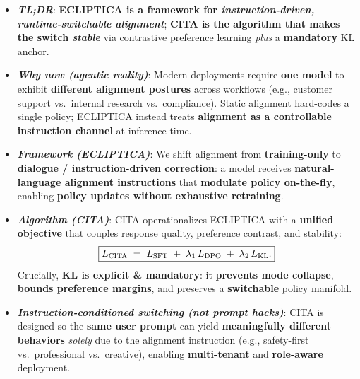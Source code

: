 \documentclass[11pt]{article}
\begin{document}
\begin{defin}
\scriptsize
\vspace{-2mm}
\begin{itemize}[left=-4pt,itemsep=0pt,topsep=0pt,parsep=0pt]

\item[\faBolt] \textbf{\textit{TL;DR}}:
\textbf{ECLIPTICA is a framework for \emph{instruction-driven, runtime-switchable alignment}};
\textbf{CITA is the algorithm that makes the switch \emph{stable}} via contrastive preference learning \emph{plus} a \textbf{mandatory} KL anchor.

\item[\faGlobeAmericas] \textbf{\textit{Why now (agentic reality)}}:
Modern deployments require \textbf{one model} to exhibit \textbf{different alignment postures} across workflows (e.g., customer support vs.\ internal research vs.\ compliance).
Static alignment hard-codes a single policy; ECLIPTICA instead treats \textbf{alignment as a controllable instruction channel} at inference time.

\item[\faCompass] \textbf{\textit{Framework (ECLIPTICA)}}:
We shift alignment from \textbf{training-only} to \textbf{dialogue / instruction-driven correction}:
a model receives \textbf{natural-language alignment instructions} that \textbf{modulate policy on-the-fly}, enabling \textbf{policy updates without exhaustive retraining}.

\item[\faCogs] \textbf{\textit{Algorithm (CITA)}}:
CITA operationalizes ECLIPTICA with a \textbf{unified objective} that couples response quality, preference contrast, and stability:
\[\boxed{
L_{\textsc{CITA}} \;=\; L_{\textsc{SFT}} \;+\; \lambda_1\,L_{\textsc{DPO}} \;+\; \lambda_2\,L_{\textsc{KL}}.
}
\]
Crucially, \textbf{KL is explicit \& mandatory}: it \textbf{prevents mode collapse}, \textbf{bounds preference margins}, and preserves a \textbf{switchable} policy manifold.

\item[\faRandom] \textbf{\textit{Instruction-conditioned switching (not prompt hacks)}}:
CITA is designed so the \textbf{same user prompt} can yield \textbf{meaningfully different behaviors} \emph{solely} due to the alignment instruction
(e.g., safety-first vs.\ professional vs.\ creative), enabling \textbf{multi-tenant} and \textbf{role-aware} deployment.


\end{itemize}
\end{defin}
\end{document}
